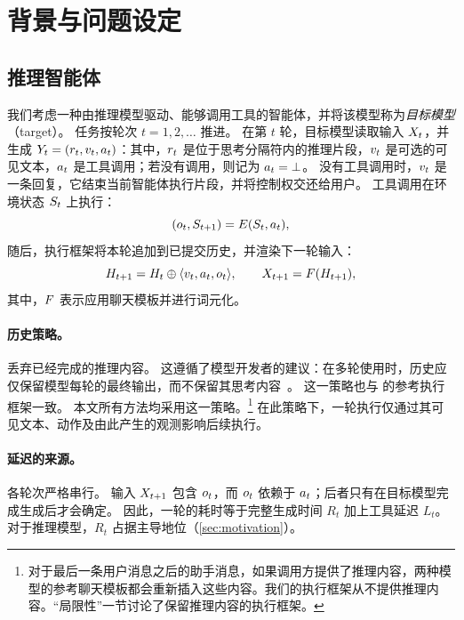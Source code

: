 \section{背景与问题设定}
\label{sec:background}

\subsection{推理智能体}
\label{sec:background:loop}

我们考虑一种由推理模型驱动、能够调用工具的智能体，并将该模型称为\emph{目标模型}（target）。
任务按轮次 $t=1,2,\dots$ 推进。
在第 $t$ 轮，目标模型读取输入 $X_{t}$，并生成 $Y_t=(r_{t},v_{t},a_{t})$：其中，$r_{t}$ 是位于思考分隔符内的推理片段，$v_{t}$ 是可选的可见文本，$a_{t}$ 是工具调用；若没有调用，则记为 $a_{t}=\bot$。
没有工具调用时，$v_{t}$ 是一条回复，它结束当前智能体执行片段，并将控制权交还给用户。
工具调用在环境状态 $S_{t}$ 上执行：
\begin{equation}
  (o_{t},S_{t+1}) = E(S_{t},a_{t}),
  \label{eq:env}
\end{equation}
随后，执行框架将本轮追加到已提交历史，并渲染下一轮输入：
\begin{equation}
  H_{t+1} = H_t \oplus \langle v_{t},a_{t},o_{t}\rangle,
  \qquad
  X_{t+1} = F(H_{t+1}),
  \label{eq:history}
\end{equation}
其中，$F$ 表示应用聊天模板并进行词元化。

\paragraph{历史策略。}
 丢弃已经完成的推理内容。
这遵循了模型开发者的建议：在多轮使用时，历史应仅保留模型每轮的最终输出，而不保留其思考内容~\citep{qwen2025qwen3card,qwen2026qwen35card}。
这一策略也与 \citet{bai2026spork} 的参考执行框架一致。
本文所有方法均采用这一策略。\footnote{对于最后一条用户消息之后的助手消息，如果调用方提供了推理内容，两种模型的参考聊天模板都会重新插入这些内容。我们的执行框架从不提供推理内容。“局限性”一节讨论了保留推理内容的执行框架。}
在此策略下，一轮执行仅通过其可见文本、动作及由此产生的观测影响后续执行。

\paragraph{延迟的来源。}
各轮次严格串行。
输入 $X_{t+1}$ 包含 $o_{t}$，而 $o_{t}$ 依赖于 $a_{t}$；后者只有在目标模型完成生成后才会确定。
因此，一轮的耗时等于完整生成时间 $R_t$ 加上工具延迟 $L_t$。
对于推理模型，$R_t$ 占据主导地位（\cref{sec:motivation}）。

